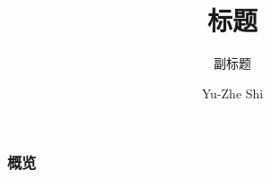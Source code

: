 \documentclass[UTF8]{ctexbeamer}
\title[About Beamer] %
{标题}
\subtitle{副标题}
\author[Yu-Zhe Shi] {Yu-Zhe Shi}
\begin{document}
\maketitle
\begin{frame}
    \frametitle{概览}


\end{frame}
\end{document}
